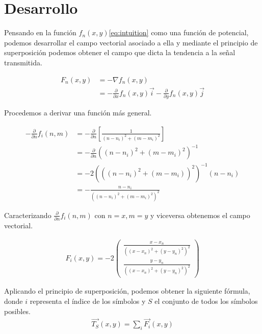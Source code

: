 \documentclass{article}
\newcommand{\partder}[1]{\frac{\partial}{\partial #1}}
\begin{document}
\section{Desarrollo}
Pensando en la función $f_n(x,y)$\ref{eq:intuition} como una función de
potencial, podemos desarrollar el campo vectorial asociado a ella y
mediante el principio de superposición podemos obtener el campo que
dicta la tendencia a la señal transmitida.

\begin{align}
  \label{eq:development}
  F_n\left( x, y \right) &= -\nabla f_n\left( x, y \right)\\
  &= - \partder{x} f_n \left( x, y \right) \vec{i} - \partder{y} f_n \left( x, y \right) \vec{j}
\end{align}

Procedemos a derivar una función más general.

\begin{align}
  \label{eq:derivative}
  - \partder{n} f_i \left( n, m \right) &= - \partder{n} \left[ \frac{1}{\left( n - n_i \right)^2 + \left( m - m_i \right)^2 } \right]\\
  &= - \partder{n} \left( \left( n - n_i \right)^2 + \left( m - m_i \right)^2 \right)^{-1}\\
  &= - 2\left( \left( \left( n - n_i \right)^2 + \left( m - m_i \right) \right)^2 \right)^{-1} \left( n - n_i \right)\\
  &= - \frac{n - n_i}{\left( \left( n - n_i \right)^2 + \left( m - m_i \right)^2 \right)^2}
\end{align}

Caracterizando $\partder{n}f_i\left( n, m \right)$ con $n = x, m = y$ y viceversa
obtenemos el campo vectorial.

\begin{align}
  \label{eq:development2}
  F_i(x,y) = - 2 \left(
  \begin{array}{c}
    \frac{x - x_n}{\left( \left( x - x_n \right)^2 + \left( y - y_n \right)^2\right)^2}\\
    \frac{y - y_n}{\left( \left( x - x_n \right)^2 + \left( y - y_n \right)^2\right)^2}
  \end{array}
  \right)
\end{align}

Aplicando el principio de superposición, podemos obtener la siguiente fórmula,
donde $i$ representa el índice de los símbolos y $S$ el conjunto de todos los
símbolos posibles.
\begin{align}
  \label{eq:superposition}
  \vec{T_S}(x,y) = \sum\limits_{i} \vec{F_i}\left( x, y\right)
\end{align}
\end{document}
